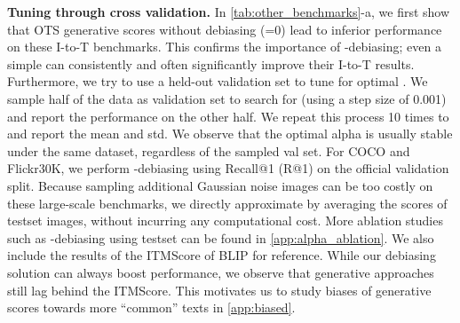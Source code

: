 \documentclass{article} \usepackage{iclr2024_conference,times}
\begin{document}
{\bf Tuning  through cross validation.} In \autoref{tab:other_benchmarks}-a, we first show that OTS generative scores without debiasing (=0) lead to inferior performance on these I-to-T benchmarks. This confirms the importance of -debiasing; even a simple  can consistently and often significantly improve their I-to-T results. Furthermore, we try to use a held-out validation set to tune for optimal . We sample half of the data as validation set to search for  (using a step size of 0.001) and report the performance on the other half. We repeat this process 10 times to and report the mean and std. We observe that the optimal alpha is usually stable under the same dataset, regardless of the sampled val set.
For COCO and Flickr30K, we perform -debiasing using Recall@1 (R@1) on the official validation split. Because sampling additional Gaussian noise images can be too costly on these large-scale benchmarks, we directly approximate  by averaging the scores of testset images, without incurring any computational cost.  More ablation studies such as -debiasing using testset can be found in \autoref{app:alpha_ablation}. We also include the results of the ITMScore of BLIP for reference. While our debiasing solution can always boost performance, we observe that generative approaches still lag behind the ITMScore. This motivates us to study biases of generative scores towards more ``common'' texts in \autoref{app:biased}.
\end{document}
